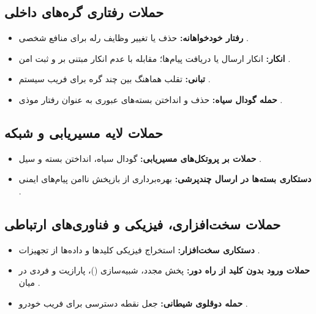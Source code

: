 \documentclass[12pt,a4paper]{article}
\begin{document}
\subsection{حملات رفتاری گره‌های داخلی}

\begin{itemize}
  \item \textbf{رفتار خودخواهانه:} حذف یا تغییر وظایف رله برای منافع شخصی \cite{farsimadanReviewSecurityChallenges2025}.
  \item \textbf{انکار:} انکار ارسال یا دریافت پیام‌ها؛ مقابله با عدم انکار مبتنی بر  و ثبت امن \cite{VanetSecurityPrivacy}.
  \item \textbf{تبانی:} تقلب هماهنگ بین چند گره برای فریب سیستم \cite{rahmawatiagustinaSystematicLiteratureReview2025}.
  \item \textbf{حمله گودال سیاه:} حذف و انداختن بسته‌های عبوری به عنوان رفتار موذی \cite{farsimadanReviewSecurityChallenges2025}.
\end{itemize}

\subsection{حملات لایه مسیریابی و شبکه}

\begin{itemize}
  \item \textbf{حملات بر پروتکل‌های مسیریابی:} گودال سیاه، انداختن بسته و سیل \cite{VanetSecurityPrivacy}.
  \item \textbf{دستکاری بسته‌ها در ارسال چندپرشی:} بهره‌برداری از بازپخش ناامن پیام‌های ایمنی \cite{farsimadanReviewSecurityChallenges2025}.
\end{itemize}

\subsection{حملات سخت‌افزاری، فیزیکی و فناوری‌های ارتباطی}

\begin{itemize}
  \item \textbf{دستکاری سخت‌افزار:} استخراج فیزیکی کلیدها و داده‌ها از تجهیزات \cite{farsimadanReviewSecurityChallenges2025}.
  \item \textbf{حملات ورود بدون کلید از راه دور:} پخش مجدد، شبیه‌سازی ()، پارازیت و فردی در میان \cite{farsimadanReviewSecurityChallenges2025}.
  \item \textbf{حمله دوقلوی شیطانی:} جعل نقطه دسترسی  برای فریب خودرو \cite{farsimadanReviewSecurityChallenges2025}.
\end{itemize}
\end{document}
